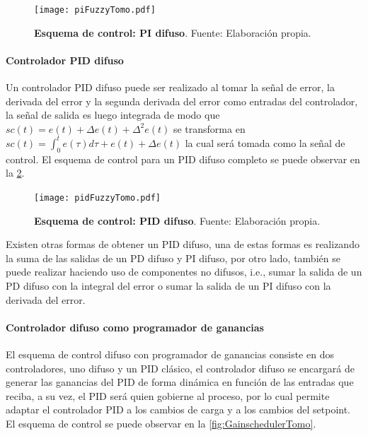                 \begin{figure}[htb]
                    \centering
                    \texttt{[image: piFuzzyTomo.pdf]}
                    \caption[Esquema de control: PI difuso]{\textbf{Esquema de control: PI difuso}. Fuente: Elaboración propia.} 
                    \label{fig:piFuzzyTomo}
                \end{figure}

                \pagebreak

            \paragraph{Controlador PID difuso}
                
                Un controlador PID difuso puede ser realizado al tomar la señal de error, la derivada del error y la segunda derivada del error como entradas del controlador, la señal de salida es luego integrada de modo que $sc(t) = e(t) + \Delta e(t) + \Delta^2 e(t)$ se transforma en $sc(t) = \int_0^t e(\tau)d\tau + e(t) + \Delta e(t)$ la cual será tomada como la señal de control. El esquema de control para un PID difuso completo se puede observar en la \cref{fig:pidFuzzyTomo}.

                \begin{figure}[htb]
                    \centering
                    \texttt{[image: pidFuzzyTomo.pdf]}
                    \caption[Esquema de control: PID difuso]{\textbf{Esquema de control: PID difuso}. Fuente: Elaboración propia.} 
                    \label{fig:pidFuzzyTomo}
                \end{figure}

                Existen otras formas de obtener un PID difuso, una de estas formas es realizando la suma de las salidas de un PD difuso y PI difuso, por otro lado, también se puede realizar haciendo uso de componentes no difusos, i.e., sumar la salida de un PD difuso con la integral del error o sumar la salida de un PI difuso con la derivada del error.

            \paragraph{Controlador difuso como programador de ganancias}
                
                El esquema de control difuso con programador de ganancias consiste en dos controladores, uno difuso y un PID clásico, el controlador difuso se encargará de generar las ganancias del PID de forma dinámica en función de las entradas que reciba, a su vez, el PID será quien gobierne al proceso, por lo cual permite adaptar el controlador PID a los cambios de carga y a los cambios del setpoint. El esquema de control se puede observar en la \cref{fig:GainschedulerTomo}.

